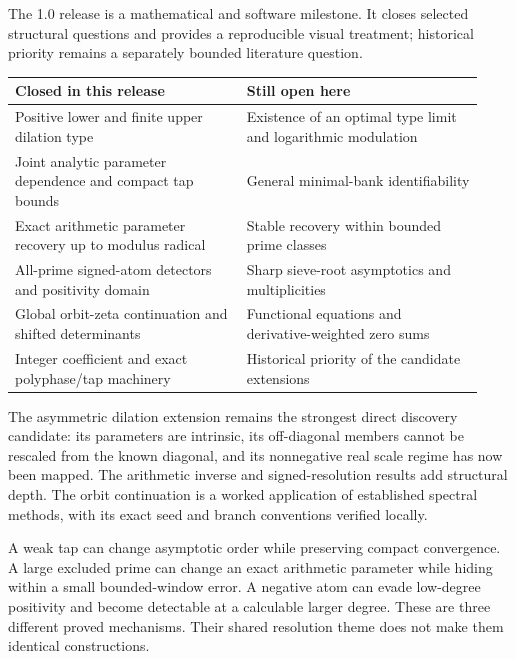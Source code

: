 The 1.0 release is a mathematical and software milestone. It closes selected
structural questions and provides a reproducible visual treatment; historical
priority remains a separately bounded literature question.

\begin{tabular}{@{}>{\raggedright\arraybackslash}p{0.46\linewidth}>{\raggedright\arraybackslash}p{0.47\linewidth}@{}}
\toprule
Closed in this release & Still open here\\\midrule
Positive lower and finite upper dilation type & Existence of an optimal type limit and logarithmic modulation\\
Joint analytic parameter dependence and compact tap bounds & General minimal-bank identifiability\\
Exact arithmetic parameter recovery up to modulus radical & Stable recovery within bounded prime classes\\
All-prime signed-atom detectors and positivity domain & Sharp sieve-root asymptotics and multiplicities\\
Global orbit-zeta continuation and shifted determinants & Functional equations and derivative-weighted zero sums\\
Integer coefficient and exact polyphase/tap machinery & Historical priority of the candidate extensions\\
\bottomrule\end{tabular}

The asymmetric dilation extension remains the strongest direct discovery
candidate: its parameters are intrinsic, its off-diagonal members cannot be
rescaled from the known diagonal, and its nonnegative real scale regime has now been
mapped. The arithmetic inverse and signed-resolution results add structural
depth. The orbit continuation is a worked application of established spectral
methods, with its exact seed and branch conventions verified locally.

A weak tap can change asymptotic order while preserving compact convergence.
A large excluded prime can change an exact arithmetic parameter while hiding
within a small bounded-window error. A negative atom can evade low-degree
positivity and become detectable at a calculable larger degree.
These are three different proved mechanisms. Their shared resolution theme
does not make them identical constructions.

